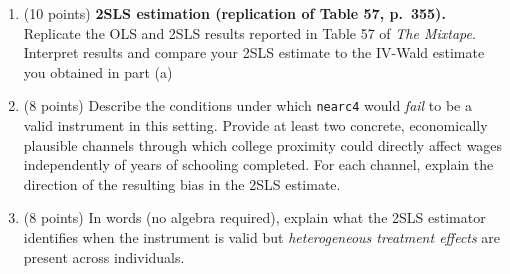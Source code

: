 \documentclass[letterpaper,12pt]{article}
\begin{document}
\begin{enumerate}[label=(\alph*)]
\item (10 points) \textbf{2SLS estimation (replication of Table 57, p.\ 355).}
Replicate the OLS and 2SLS results reported in Table 57 of \textit{The Mixtape}. Interpret results and compare your 2SLS estimate to the IV-Wald estimate you obtained in part (a)


\item (8 points) Describe the conditions under which \texttt{nearc4} would \emph{fail} to be a valid instrument in this setting. Provide at least two concrete, economically plausible channels through which college proximity could directly affect wages independently of years of schooling completed. For each channel, explain the direction of the resulting bias in the 2SLS estimate.

\item (8 points) In words (no algebra required), explain what the 2SLS estimator identifies when the instrument is valid but \emph{heterogeneous treatment effects} are present across individuals.

\end{enumerate}
\end{document}
